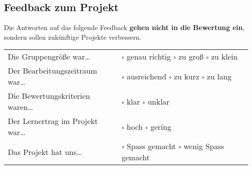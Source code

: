 \documentclass[10pt, a4paper]{scrartcl}
\begin{document}
\subsection*{Feedback zum Projekt}
Die Antworten auf das folgende Feedback \textbf{gehen nicht in die Bewertung ein}, sondern sollen zukünftige Projekte verbessern.

\begin{tabularx}{\textwidth}{p{6cm}X}
	Die Gruppengröße war\dots & $\square$ genau richtig \hspace{1cm} $\square$ zu groß \hspace{1cm} $\square$ zu klein \\
	Der Bearbeitungszeitraum war\dots & $\square$ ausreichend \hspace{1cm} $\square$ zu kurz \hspace{1cm} $\square$ zu lang \\
	Die Bewertungskriterien waren\dots & $\square$ klar \hspace{1cm} $\square$ unklar \\
	Der Lernertrag im Projekt war\dots & $\square$ hoch \hspace{1cm} $\square$ gering \\
	Das Projekt hat uns\dots & $\square$ Spass gemacht \hspace{1cm} $\square$ wenig Spass gemacht \\
\end{tabularx}
\end{document}
